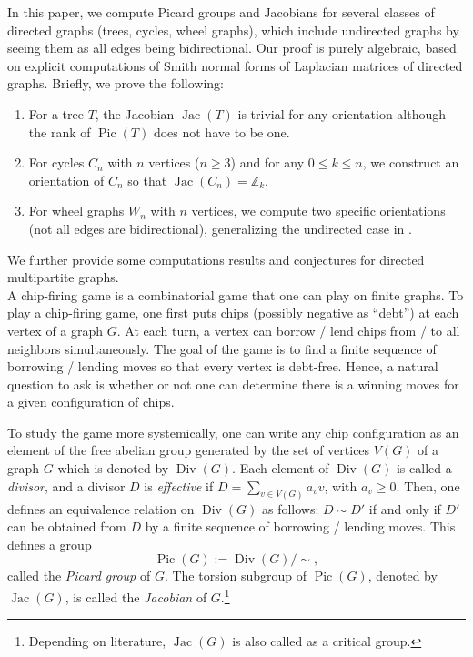 \documentclass[11pt,reqno]{amsart}
\DeclareMathOperator{\Pic}{Pic}
\DeclareMathOperator{\Jac}{Jac}
\DeclareMathOperator{\Div}{Div}
\theoremstyle{definition}
\theoremstyle{plain}
\begin{document}
In this paper, we compute Picard groups and Jacobians for several classes of directed graphs (trees, cycles, wheel graphs), which include undirected graphs by seeing them as all edges being bidirectional. Our proof is purely algebraic, based on explicit computations of Smith normal forms of Laplacian matrices of directed graphs. Briefly, we prove the following:
\begin{enumerate}
	\item 
For a tree $T$, the Jacobian $\Jac(T)$ is trivial for any orientation although the rank of $\Pic(T)$ does not have to be one.
\item 
For cycles $C_n$ with $n$ vertices ($n\geq 3$) and for any $0 \leq k \leq n$, we construct an orientation of $C_n$ so that $\Jac(C_n)=\mathbb{Z}_k$. 
\item 
For wheel graphs $W_n$ with $n$ vertices, we compute two specific orientations (not all edges are bidirectional), generalizing the undirected case in \cite{biggs1999chip}. 
\end{enumerate}
We further provide some computations results and conjectures for directed multipartite graphs.\\


A chip-firing game is a combinatorial game that one can play on finite graphs. To play a chip-firing game, one first puts chips (possibly negative as ``debt'') at each vertex of a graph $G$. At each turn, a vertex can borrow / lend chips from / to all neighbors simultaneously. The goal of the game is to find a finite sequence of borrowing / lending moves so that every vertex is debt-free. Hence, a natural question to ask is whether or not one can determine there is a winning moves for a given configuration of chips. 

To study the game more systemically, one can write any chip configuration as an element of the free abelian group generated by the set of vertices $V(G)$ of a graph $G$ which is denoted by $\Div(G)$. Each element of $\Div(G)$ is called a \textit{divisor}, and a divisor $D$ is \textit{effective} if $D=\sum_{v \in V(G)} a_v v$, with $a_v \geq 0$. Then, one defines an equivalence relation on $\Div(G)$ as follows: $D\sim D'$ if and only if $D'$ can be obtained from $D$ by a finite sequence of borrowing / lending moves. This defines a group 
\[
\Pic(G):=\Div(G)/\sim,
\]
called the \textit{Picard group} of $G$. 
The torsion subgroup of $\Pic(G)$, denoted by $\Jac(G)$, is called the \textit{Jacobian} of $G$.\footnote{Depending on literature, $\Jac(G)$ is also called as a critical group.}
\end{document}
